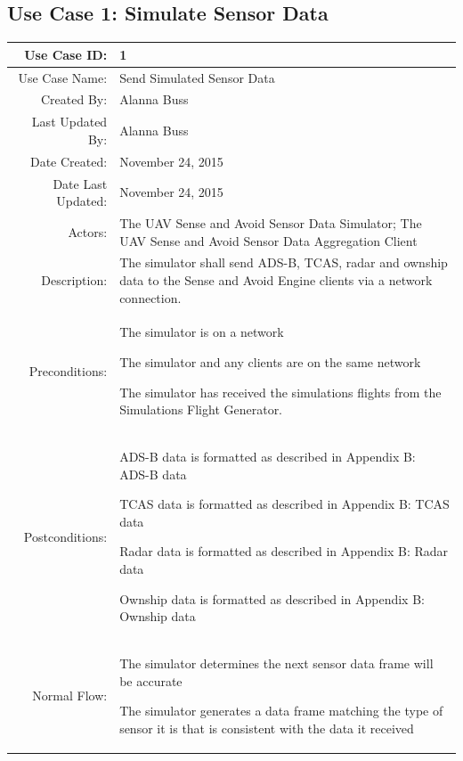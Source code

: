 \documentclass[12pt,oneside,letterpaper]{article}
\newenvironment{packed_enumerate}{ %
\vspace{-7mm}
\begin{enumerate}
  \setlength{\itemsep}{0pt}
  \setlength{\parskip}{0pt}
  \setlength{\parsep}{0pt}
}{\end{enumerate}
\vspace{-8mm}}
\begin{document}
\subsection{\label{Sim Data}Use Case 1: Simulate Sensor Data}
\begin{longtable}{|r|p{3.8in}|}
\hline
Use Case ID:&1\\
\hline
Use Case Name:&Send Simulated Sensor Data\\
\hline
Created By:&Alanna Buss\\
\hline
Last Updated By:&Alanna Buss\\
\hline
Date Created:&November 24, 2015\\
\hline
Date Last Updated:&November 24, 2015\\
\hline
Actors:&The UAV Sense and Avoid Sensor Data Simulator; The UAV Sense and Avoid Sensor Data Aggregation Client\\
\hline
Description:&The simulator shall send ADS-B, TCAS, radar and ownship data to the Sense and Avoid Engine clients via a network connection.\\
\hline
Preconditions:&
\begin{packed_enumerate}
\item The simulator is on a network
\item The simulator and any clients are on the same network
\item The simulator has received the simulations flights from the Simulations Flight Generator.
\end{packed_enumerate}\\
\hline
Postconditions:&
\begin{packed_enumerate}
\item ADS-B data is formatted as described in Appendix B: ADS-B data
\item TCAS data is formatted as described in Appendix B: TCAS data
\item Radar data is formatted as described in Appendix B: Radar data
\item Ownship data is formatted as described in Appendix B: Ownship data
\end{packed_enumerate}\\
\hline
Normal Flow:&
\begin{packed_enumerate}
\item The simulator determines the next sensor data frame will be accurate
\item The simulator generates a data frame matching the type of sensor it is that is consistent with the data it received

\end{packed_enumerate}
\end{longtable}
\end{document}
